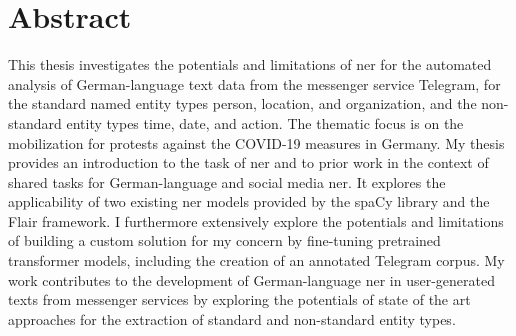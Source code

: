 \chapter*{Abstract}

This thesis investigates the potentials and limitations of \gls{ner} for the automated analysis of German-language text data from the messenger service Telegram, for the standard named entity types person, location, and organization, and the non-standard entity types time, date, and action. The thematic focus is on the mobilization for protests against the COVID-19 measures in Germany. 
My thesis provides an introduction to the task of \gls{ner} and to prior work in the context of shared tasks for German-language and social media \gls{ner}. It explores the applicability of two existing \gls{ner} models provided by the spaCy library and the Flair framework. I furthermore extensively explore the potentials and limitations of building a custom solution for my concern by fine-tuning pretrained transformer models, including the creation of an annotated Telegram corpus. My work contributes to the development of German-language \gls{ner} in user-generated texts from messenger services by exploring the potentials of state of the art approaches for the extraction of standard and non-standard entity types. 